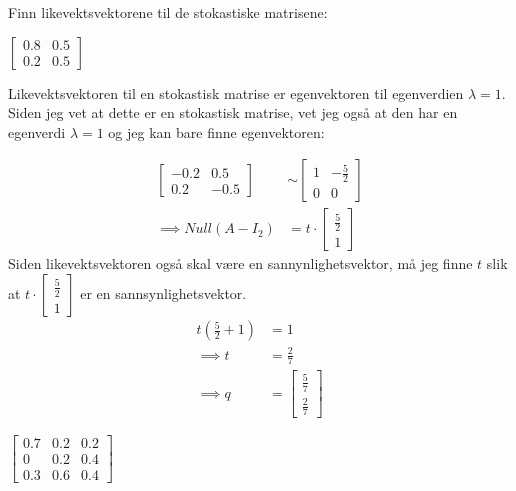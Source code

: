 \documentclass[11pt, a4paper, norsk]{NTNUoving}
\begin{document}
   \begin{oppgave}
       Finn likevektsvektorene til de stokastiske matrisene:

       \begin{punkt}
            $\begin{bmatrix}
               0.8 & 0.5 \\
               0.2 & 0.5
           \end{bmatrix}$

           Likevektsvektoren til en stokastisk matrise er egenvektoren til egenverdien $\lambda = 1$. Siden jeg vet at dette er en stokastisk matrise, vet jeg også at den har en egenverdi $\lambda = 1$ og jeg kan bare finne egenvektoren:

           \begin{align*}
               \begin{bmatrix}
                   -0.2 & 0.5 \\
                   0.2 & -0.5
               \end{bmatrix} &\sim \begin{bmatrix}
               1 & -\frac{5}{2} \\
               0 & 0
               \end{bmatrix}
               \\
               \implies Null(A - I_2) &= t\cdot \begin{bmatrix}
                   \frac{5}{2} \\
                   1
               \end{bmatrix}
           \end{align*} 
           Siden likevektsvektoren også skal være en sannynlighetsvektor, må jeg finne $t$ slik at $t \cdot \begin{bmatrix}
               \frac{5}{2} \\
               1
           \end{bmatrix}$ er en sannsynlighetsvektor.
           \begin{align*}
               t(\frac{5}{2} + 1) &= 1
               \\
               \implies t &= \frac{2}{7}
               \\
               \implies q &= \begin{bmatrix}
                   \frac{5}{7} \\
                   \frac{2}{7}
               \end{bmatrix}
           \end{align*}
       \end{punkt}
       \begin{punkt}
           $
           \begin{bmatrix}
               0.7 & 0.2 & 0.2 \\
               0 & 0.2 & 0.4 \\
               0.3 & 0.6 & 0.4
           \end{bmatrix}
            $
            

\end{punkt}
\end{oppgave}
\end{document}
